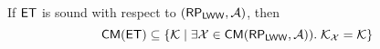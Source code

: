 \begin{theorem}
\label{thm:main-body-et_soundness}
If $\mathsf{ET}$ is sound with respect to $(\RP_{\LWW}, \Ax)$, then 
\[
    \CMs(\ET) \subseteq \{ \hh \mid \exists \aexec \in \CMa(\RP_{\LWW}, \Ax)).\;\hh_{\aexec} = \hh\}
\]
\end{theorem}

%
%
